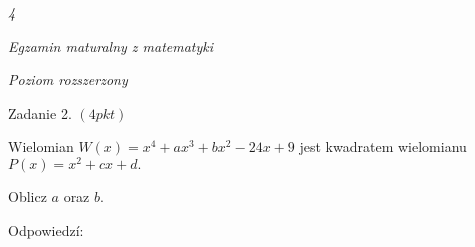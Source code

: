 \documentclass[a4paper,12pt]{article}
\begin{document}
{\it 4}

{\it Egzamin maturalny z matematyki}

{\it Poziom rozszerzony}

Zadanie 2. $(4pkt)$

Wielomian $W(x)=x^{4}+ax^{3}+bx^{2}-24x+9$ jest kwadratem wielomianu $P(x)=x^{2}+cx+d.$

Oblicz $a$ oraz $b.$

Odpowiedzí:
\end{document}
